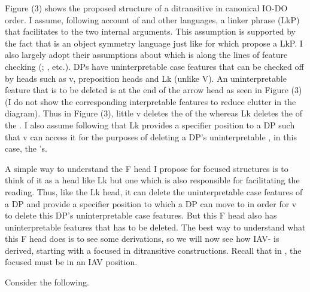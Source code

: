 \documentclass[output=paper,newtxmath,modfonts,nonflat,draft]{langsci/langscibook}
\begin{document}
Figure (3) shows the proposed structure of a ditransitive in canonical IO-DO order. I assume, following  account of  and other  languages, a linker phrase (LkP) that facilitates  to the two internal arguments. This assumption is supported by the fact that  is an object symmetry language \cite{Diercks2013} just like  for which \citet{Baker2006} propose a LkP. I also largely adopt their assumptions about  which is along the lines of feature checking (\citealt{Chomsky1995}; \citeyear{Chomsky2000}, etc.). DPs have uninterpretable case features that can be checked off by heads such as v, preposition heads and Lk (unlike V). An uninterpretable feature that is to be deleted is at the end of the arrow head as seen in Figure (3) (I do not show the corresponding interpretable features to reduce clutter in the diagram). Thus in Figure (3), little v deletes the  of the  whereas Lk deletes the  of the . I also assume following \citet{Baker2006} that Lk provides a specifier position to a DP such that v can access it for the purposes of deleting a DP’s uninterpretable , in this case, the ’s.

A simple way to understand the F head I propose for focused structures is to think of it as a head like Lk but one which is also responsible for facilitating the  reading. Thus, like the Lk head, it can delete the uninterpretable case features of a DP and provide a specifier position to which a DP can move to in order for v to delete this DP’s uninterpretable case features. But this F head also has uninterpretable  features that has to be deleted. The best way to understand what this F head does is to see some derivations, so we will now see how  IAV- is derived, starting with a focused  in ditransitive constructions. Recall that in , the focused  must be in an IAV position.   

Consider the following. 
\end{document}
